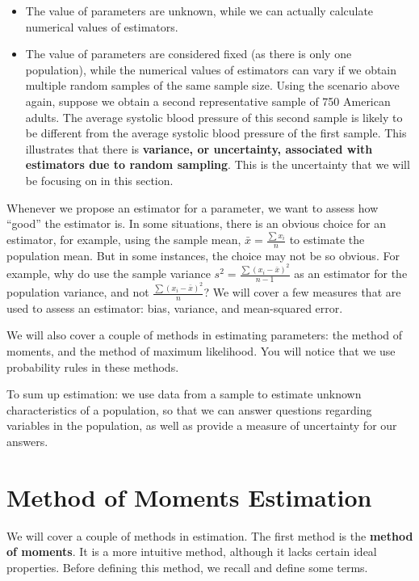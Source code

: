\documentclass[
]{book}
\providecommand{\tightlist}{%
  \setlength{\itemsep}{0pt}\setlength{\parskip}{0pt}}
\begin{document}
\begin{itemize}
\tightlist
\item
  The value of parameters are unknown, while we can actually calculate numerical values of estimators.
\item
  The value of parameters are considered fixed (as there is only one population), while the numerical values of estimators can vary if we obtain multiple random samples of the same sample size. Using the scenario above again, suppose we obtain a second representative sample of 750 American adults. The average systolic blood pressure of this second sample is likely to be different from the average systolic blood pressure of the first sample. This illustrates that there is \textbf{variance, or uncertainty, associated with estimators due to random sampling}. This is the uncertainty that we will be focusing on in this section.
\end{itemize}

Whenever we propose an estimator for a parameter, we want to assess how ``good'' the estimator is. In some situations, there is an obvious choice for an estimator, for example, using the sample mean, \(\bar{x} = \frac{\sum x_i}{n}\) to estimate the population mean. But in some instances, the choice may not be so obvious. For example, why do use the sample variance \(s^2 = \frac{\sum (x_i - \bar{x})^2}{n-1}\) as an estimator for the population variance, and not \(\frac{\sum (x_i - \bar{x})^2}{n}\)? We will cover a few measures that are used to assess an estimator: bias, variance, and mean-squared error.

We will also cover a couple of methods in estimating parameters: the method of moments, and the method of maximum likelihood. You will notice that we use probability rules in these methods.

To sum up estimation: we use data from a sample to estimate unknown characteristics of a population, so that we can answer questions regarding variables in the population, as well as provide a measure of uncertainty for our answers.

\section{Method of Moments Estimation}\label{MOM}

We will cover a couple of methods in estimation. The first method is the \textbf{method of moments}. It is a more intuitive method, although it lacks certain ideal properties. Before defining this method, we recall and define some terms.
\end{document}
